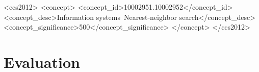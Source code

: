\documentclass[sigconf,10pt]{acmart}
\begin{document}
\author{Anonymous Author}



\begin{CCSXML}
<ccs2012>
 <concept>
  <concept_id>10002951.10002952</concept_id>
  <concept_desc>Information systems~Nearest-neighbor search</concept_desc>
  <concept_significance>500</concept_significance>
 </concept>
</ccs2012>
\end{CCSXML}


\maketitle





\section{Evaluation}
\label{sec:eval}



\end{document}
